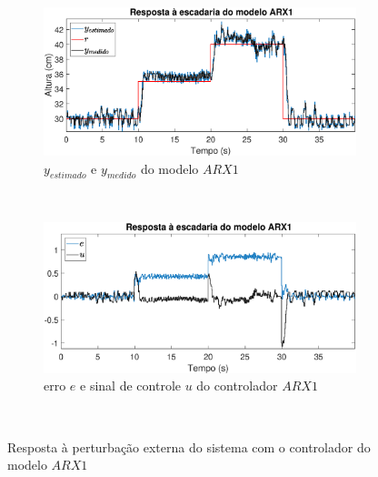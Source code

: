\begin{figure}[H]
	\centering
	\begin{subfigure}[b]{1\textwidth}
		\includegraphics[width=1\linewidth]{stairrarx1y}
		\caption[$y_{estimado}$ e $y_{medido}$ do modelo $ARX1$]{$y_{estimado}$ e $y_{medido}$ do modelo $ARX1$}
		\label{fig:stairrarx1y}
	\end{subfigure}
	~ %
	\begin{subfigure}[b]{1\textwidth}
		\includegraphics[width=1\linewidth]{stairrarx1e}
		\caption[erro $e$ e sinal de controle $u$ do controlador $ARX1$]{erro $e$ e sinal de controle $u$ do controlador $ARX1$}
		\label{fig:stairrarx1e}
	\end{subfigure}
	~ %
	
	\caption{Resposta à perturbação externa do sistema com o controlador do modelo $ARX1$}\label{fig:stairrarx1}
\end{figure}

